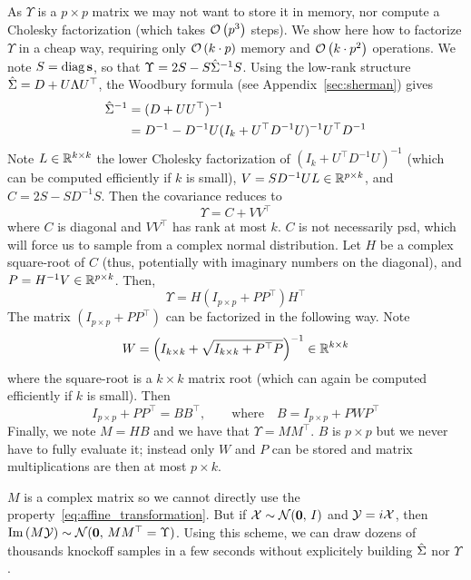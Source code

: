 \bigbreak
As $\Upsilon$ is a $p \times p$ matrix we may not want to store it in memory,
nor compute a Cholesky factorization (which takes $\mathcal{O}\left( p^3 \right)$ steps).
We show here how to factorize $\Upsilon$ in a cheap way,
requiring only $\mathcal{O}\left( k \cdot p \right)$ memory and $\mathcal{O}\left( k\cdot p^2 \right)$ operations.
We note $S = \operatorname*{diag}\mathbf{s}$, so that $\Upsilon = 2S - S\hat{\Sigma}^{-1}S$.
Using the low-rank structure $\hat{\Sigma} = D + U\Lambda U^\top$,
the Woodbury formula (see Appendix~\ref{sec:sherman}) gives
\begin{align*}
    \hat{\Sigma}^{-1} &= (D + UU^\top)^{-1}\\
    &= D^{-1} - D^{-1}U(I_k + U^\top D^{-1}U)^{-1}U^\top D^{-1}
\end{align*}
Note $L \in \mathbb{R}^{k \times k}$ the lower Cholesky factorization of
$(I_k + U^\top D^{-1}U)^{-1}$ (which can be computed efficiently if $k$ is small),
$V = SD^{-1}UL \in \mathbb{R}^{p \times k}$,
and $C = 2S - SD^{-1}S$.
Then the covariance reduces to
\begin{equation*}
    \Upsilon = C + VV^\top
\end{equation*}
where $C$ is diagonal and $VV^\top$ has rank at most $k$.
$C$ is not necessarily psd, which will force us to sample from a complex normal distribution.
Let $H$ be a complex square-root of $C$ (thus, potentially with imaginary numbers on the diagonal),
and $P = H^{-1}V \in \mathbb{R}^{p \times k}$.
Then,
\begin{equation*}
    \Upsilon = H \left( I_{p \times p} + PP^\top \right) H^\top
\end{equation*}
The matrix $\left( I_{p \times p} + PP^\top \right)$ can be factorized in the following way.
Note
\begin{equation*}
    W = \left(I_{k \times k} + \sqrt{I_{k \times k} + P^\top P}\right)^{-1} \in \mathbb{R}^{k \times k}
\end{equation*}
where the square-root is a $k \times k$ matrix root (which can again be computed efficiently if $k$ is small).
Then
\begin{equation*}
    I_{p \times p} + PP^\top = BB^\top
    ,\qquad
    \text{where}
    \quad
    B = I_{p \times p} + PWP^\top
\end{equation*}
Finally, we note $M = HB$ and we have that $\Upsilon = MM^\top$.
$B$ is $p \times p$ but we never have to fully evaluate it;
instead only $W$ and $P$ can be stored and matrix multiplications are then at most $p \times k$.

$M$ is a complex matrix so we cannot directly use the property~\ref{eq:affine_transformation}.
But if $\mathcal{X} \sim \mathcal{N}(\mathbf{0},\, I)$ and $\mathcal{Y} = i\mathcal{X}$,
then $\operatorname{Im}\left( M\mathcal{Y} \right) \sim \mathcal{N}(\mathbf{0},\, MM^\top = \Upsilon)$.
Using this scheme, we can draw dozens of thousands knockoff samples in a few seconds without explicitely
building $\hat{\Sigma}$ nor $\Upsilon$.
